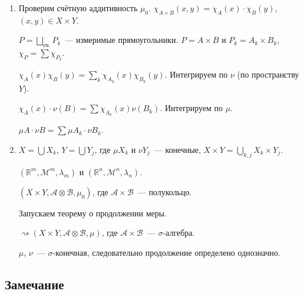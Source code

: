 \documentclass{article}
\begin{document}
            \begin{enumerate}
            
                \item 

                    Проверим счётную аддитивность $\mu_0$. $\chi_{A \times B} (x, y) = \chi_A(x) \cdot \chi_B(y)$, $(x, y) \in X \times Y$.
            
                    $P = \bigsqcup\limits_{\text{сч.}} P_k$~--- измеримые прямоугольники. $P = A \times B$ и $P_k = A_k \times B_k$, $\chi_P = \sum \chi_{P_k}$.
            
                    $\chi_A(x) \chi_B(y) = \sum\limits_k \chi_{A_k}(x) \chi_{B_k}(y)$. Интегрируем по $\nu$ (по пространству $Y$).
            
                    $\chi_A(x) \cdot \nu(B) = \sum \chi_{A_k}(x) \nu (B_k)$. Интегрируем по $\mu$.
            
                    $\mu A \cdot \nu B = \sum \mu A_k \cdot \nu B_k$.
            
                \item
                
                    $X = \bigcup X_k$, $Y = \bigcup Y_j$, где $\mu X_k$ и $\nu Y_j$~--- конечные, $X \times Y = \bigcup\limits_{k, j} X_k \times Y_j$.
    
                    $\left( \mathbb{R}^m, \mathcal{M}^m, \lambda_m \right)$ и $\left( \mathbb{R}^n, \mathcal{M}^n, \lambda_n \right)$.
    
                    $\left( X \times Y, \mathcal{A} \otimes \mathcal{B}, \mu_0 \right)$, где $\mathcal{A} \times \mathcal{B}$~--- полукольцо.
    
                    Запускаем теорему о продолжении меры.
    
                    $\rightsquigarrow \left( X \times Y, \mathcal{A} \otimes \mathcal{B}, \mu \right)$, где $\mathcal{A} \times \mathcal{B}$~--- $\sigma$-алгебра.
    
                    $\mu$, $\nu$~--- $\sigma$-конечная, следовательно продолжение определено однозначно.
            
            \end{enumerate}
            
        \subsection{Замечание}
    
\end{document}
